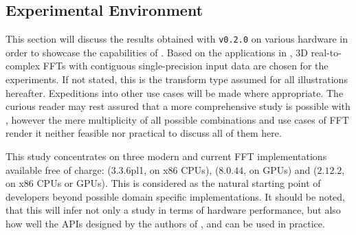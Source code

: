 \subsection{Experimental Environment}
\label{ssec:env}

This section will discuss the results obtained with \gearshifft{} \texttt{v0.2.0} on various hardware in order to showcase the capabilities of \gearshifft{}. Based on the applications in \cite{preibisch2014efficient, schmid2015real}, 3D real-to-complex FFTs with contiguous single-precision input data are chosen for the experiments. If not stated, this is the transform type assumed for all illustrations hereafter. 
%
Expeditions into other use cases will be made where appropriate. The curious reader may rest assured that a more comprehensive study is possible with \gearshifft{}, however the mere multiplicity of all possible combinations and use cases of FFT render it neither feasible nor practical to discuss all of them here.

This study concentrates on three modern and current FFT implementations available free of charge: \fftw{} ($3.3.6$pl1, on x86 CPUs), \cufft{} ($8.0.44$, on \nvidia{} GPUs) and \clfft{} ($2.12.2$, on x86 CPUs or \nvidia{} GPUs). This is considered as the natural starting point of developers beyond possible domain specific implementations. It should be noted, that this will infer not only a study in terms of hardware performance, but also how well the APIs designed by the authors of \fftw{}, \clfft{} and \cufft{} can be used in practice. 


